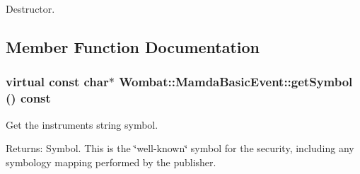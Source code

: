 Destructor. 



\subsection{Member Function Documentation}
\hypertarget{classWombat_1_1MamdaBasicEvent_8783b136a1305d21c578ced8618c090b}{
\subsubsection[getSymbol]{\setlength{\rightskip}{0pt plus 5cm}virtual const char$\ast$ Wombat::Mamda\-Basic\-Event::get\-Symbol () const}}
\label{classWombat_1_1MamdaBasicEvent_8783b136a1305d21c578ced8618c090b}


Get the instruments string symbol. 

\begin{Desc}
\item[Returns:]Symbol. This is the \char`\"{}well-known\char`\"{} symbol for the security, including any symbology mapping performed by the publisher. \end{Desc}


